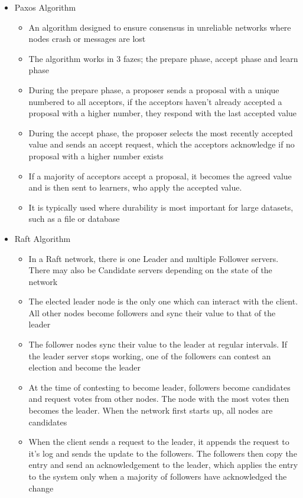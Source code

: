 \begin{itemize}
  \item Paxos Algorithm
  \begin{itemize}
    \item An algorithm designed to ensure consensus in unreliable networks where nodes crash or messages are lost
    \item The algorithm works in 3 fazes; the prepare phase, accept phase and learn phase
    \item During the prepare phase, a proposer sends a proposal with a unique numbered to all acceptors, if the acceptors haven't already accepted a proposal with a higher number, they respond with the last accepted value
    \item During the accept phase, the proposer selects the most recently accepted value and sends an accept request, which the acceptors acknowledge if no proposal with a higher number exists
    \item If a majority of acceptors accept a proposal, it becomes the agreed value and is then sent to learners, who apply the accepted value.
    \item It is typically used where durability is most important for large datasets, such as a file or database
  \end{itemize}
  \item Raft Algorithm
  \begin{itemize}
    \item In a Raft network, there is one Leader and multiple Follower servers. There may also be Candidate servers depending on the state of the network
    \item The elected leader node is the only one which can interact with the client. All other nodes become followers and sync their value to that of the leader
    \item The follower nodes sync their value to the leader at regular intervals. If the leader server stops working, one of the followers can contest an election and become the leader
    \item At the time of contesting to become leader, followers become candidates and request votes from other nodes. The node with the most votes then becomes the leader. When the network first starts up, all nodes are candidates
    \item When the client sends a request to the leader, it appends the request to it's log and sends the update to the followers. The followers then copy the entry and send an acknowledgement to the leader, which applies the entry to the system only when a majority of followers have acknowledged the change

\end{itemize}
\end{itemize}
